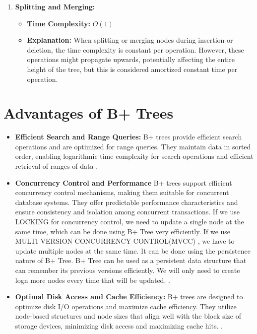 \documentclass{article}
\begin{document}
\begin{enumerate}
    \item \textbf{Splitting and Merging:}
    \begin{itemize}
        \item \textbf{Time Complexity:} \(O(1)\)
        \item \textbf{Explanation:} When splitting or merging nodes during insertion or deletion, the time complexity is constant per operation. However, these operations might propagate upwards, potentially affecting the entire height of the tree, but this is considered amortized constant time per operation.
    \end{itemize}
\end{enumerate}
\section{Advantages of B+ Trees}

\begin{itemize}
  \item \textbf{Efficient Search and Range Queries:} B+ trees provide efficient search operations and are optimized for range queries. They maintain data in sorted order, enabling logarithmic time complexity for search operations and efficient retrieval of ranges of data \cite{comer1979ubiquitous}.
\end{itemize}

\begin{itemize}
    \item \textbf{Concurrency Control and Performance} 
    B+ trees support efficient concurrency control mechanisms, making them suitable for concurrent database systems. They offer predictable performance characteristics and ensure consistency and isolation among concurrent transactions. If we use LOCKING for concurrency control, we need to update a single node at the same time, which can be done using B+ Tree very efficiently. If we use MULTI VERSION CONCURRENCY CONTROL(MVCC) , we have to update multiple nodes at the same time. It can be done using the persistence nature of B+ Tree. B+ Tree can be used as a persistent data structure that can remember its previous versions efficiently. We will only need to create logn more nodes every time that will be updated. \cite{agrawal1987concurrency}.
\end{itemize}
\begin{itemize}
  \item \textbf{Optimal Disk Access and Cache Efficiency:} B+ trees are designed to optimize disk I/O operations and maximize cache efficiency. They utilize node-based structures and node sizes that align well with the block size of storage devices, minimizing disk access and maximizing cache hits. \cite{oneil1992modern}.
\end{itemize}
\end{document}
